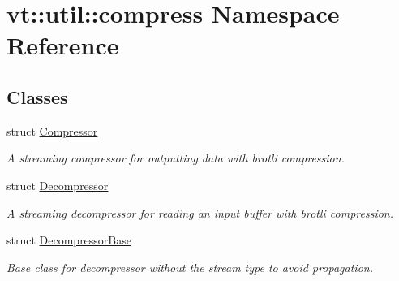 \hypertarget{namespacevt_1_1util_1_1compress}{}\section{vt\+:\+:util\+:\+:compress Namespace Reference}
\label{namespacevt_1_1util_1_1compress}
\subsection*{Classes}
\begin{DoxyCompactItemize}
\item 
struct \hyperlink{structvt_1_1util_1_1compress_1_1_compressor}{Compressor}
\begin{DoxyCompactList}\small\item\em A streaming compressor for outputting data with brotli compression. \end{DoxyCompactList}\item 
struct \hyperlink{structvt_1_1util_1_1compress_1_1_decompressor}{Decompressor}
\begin{DoxyCompactList}\small\item\em A streaming decompressor for reading an input buffer with brotli compression. \end{DoxyCompactList}\item 
struct \hyperlink{structvt_1_1util_1_1compress_1_1_decompressor_base}{Decompressor\+Base}
\begin{DoxyCompactList}\small\item\em Base class for decompressor without the stream type to avoid propagation. \end{DoxyCompactList}\end{DoxyCompactItemize}
